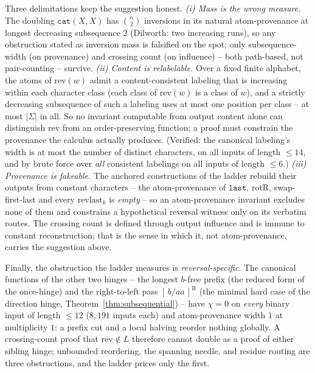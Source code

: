 \begin{remark}
    Three delimitations keep the suggestion honest. \emph{(i) Mass is the
    wrong measure.} The doubling $\mathtt{cat}(X,X)$ has
    $\binom{n}{2}$ inversions in its natural atom-provenance at longest
    decreasing subsequence $2$ (Dilworth: two increasing runs), so any
    obstruction stated as inversion mass is falsified on the spot; only
    subsequence-width (on provenance) and crossing count (on influence) --
    both path-based, not pair-counting -- survive. \emph{(ii) Content is
    relabelable.} Over a fixed finite alphabet, the atoms of
    $\mathrm{rev}(w)$ admit a content-consistent labeling that is
    increasing within each character class (each class of $\mathrm{rev}(w)$
    is a class of $w$), and a strictly decreasing subsequence of such a
    labeling uses at most one position per class -- at most $|\Sigma|$ in
    all. So no invariant computable from output content alone can
    distinguish $\mathrm{rev}$ from an order-preserving function; a proof
    must constrain the provenance the calculus actually produces.
    (Verified: the canonical labeling's width is at most the number of
    distinct characters, on all inputs of length $\leq 14$, and by brute
    force over \emph{all} consistent labelings on all inputs of length
    $\leq 6$.) \emph{(iii) Provenance is fakeable.} The anchored
    constructions of the ladder rebuild their outputs from constant
    characters -- the atom-provenance of $\mathtt{last}$, $\mathrm{rotR}$,
    swap-first-last and every $\mathrm{revlast}_k$ is \emph{empty} -- so an
    atom-provenance invariant excludes none of them and constrains a
    hypothetical reversal witness only on its verbatim routes. The
    crossing count is defined through output influence and is immune to
    constant reconstruction; that is the sense in which it, not
    atom-provenance, carries the suggestion above.

    Finally, the obstruction the ladder measures is \emph{reversal-specific}.
    The canonical functions of the other two hinges -- the longest
    $b$-free prefix (the reduced form of the once-hinge) and the
    right-to-left pass $[\,b/aa\,]^{\mathrm{R}}$ (the minimal hard case of
    the direction hinge, Theorem~\ref{thm:subsequential}) -- have
    $\chi = 0$ on \emph{every} binary input of length $\leq 12$
    ($8{,}191$ inputs each) and atom-provenance width $1$ at multiplicity
    $1$: a prefix cut and a local halving reorder nothing globally. A
    crossing-count proof that $\mathrm{rev} \notin L$ therefore cannot
    double as a proof of either sibling hinge; unbounded reordering, the
    spanning needle, and residue routing are three obstructions, and the
    ladder prices only the first.
\end{remark}
